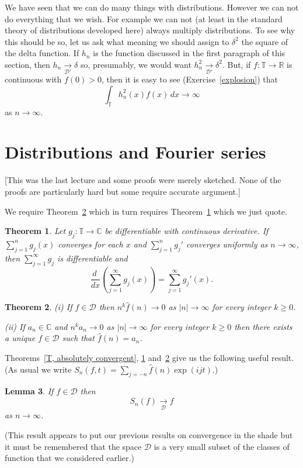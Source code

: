 \documentclass[12pt]{article}
\newtheorem{theorem}{Theorem}[section]
\newtheorem{lemma}[theorem]{Lemma}
\theoremstyle{definition}
\newcommand{\arrowD}{\underset{\mathcal D}{\rightarrow}}
\newcommand{\arrowd}{\underset{{\mathcal D}'}{\rightarrow}}
\begin{document}
We have seen that we can do many things with distributions.
However we can not do everything that we wish. For example
we can not (at least in the standard theory of distributions
developed here) always multiply distributions. To see why
this should be so, let us ask what meaning we should
assign to $\delta^{2}$ the square of the delta function.
If $h_{n}$ is the function discussed in the first paragraph
of this section, then $h_{n}\arrowd \delta$ so, presumably,
we would want $h_{n}^{2}\arrowd \delta^{2}$. But, if
$f:{\mathbb T}\rightarrow{\mathbb R}$ is continuous
with $f(0)>0$, then
it is easy to see (Exercise~\ref{explosion}) that
\[\int_{\mathbb T}h_{n}^{2}(x)f(x)\,dx\rightarrow\infty\]
as $n\rightarrow\infty$.
\section{Distributions and Fourier series}
[This was the last lecture and some proofs were merely sketched.
None of the proofs are particularly hard but some require 
accurate argument.]

We require Theorem~\ref{Very absolute} which in turn requires
Theorem~\ref{Can differentiate} which we just quote. 
\begin{theorem}\label{Can differentiate}
Let $g_{j}:{\mathbb T}\rightarrow{\mathbb C}$ be differentiable
with continuous derivative. If $\sum_{j=1}^{n}g_{j}(x)$
converges for each $x$ and
$\sum_{j=1}^{n}g_{j}'$ converges uniformly as
$n\rightarrow\infty$, then $\sum_{j=1}^{\infty}g_{j}$ is
differentiable and
\[\frac{d\ }{dx}\left(\sum_{j=1}^{\infty}g_{j}(x)\right)
=\sum_{j=1}^{\infty}g_{j}'(x).\]
\end{theorem}
\begin{theorem}\label{Very absolute}
(i) If $f\in{\mathcal D}$ then $n^{k}\hat{f}(n)\rightarrow 0$
as $|n|\rightarrow\infty$ for every integer $k\geq 0$.

(ii) If $a_{n}\in{\mathbb C}$ and
$n^{k}a_{n}\rightarrow 0$
as $|n|\rightarrow\infty$ for every integer $k\geq 0$
then there exists a unique $f\in{\mathcal D}$ such that
$\hat{f}(n)=a_{n}$.
\end{theorem}

Theorems~\ref{T, absolutely convergent},
\ref{Can differentiate} and~\ref{Very absolute}
give us the following useful result.
(As usual we write $S_{n}(f,t)=\sum_{j=-n}\hat{f}(n)\exp (ijt)$.)
\begin{lemma}\label{Fourier sum distribution} 
If $f\in{\mathcal D}$ then
\[S_{n}(f)\arrowD f\]
as $n\rightarrow\infty$.
\end{lemma}
(This result appears to put our previous results on
convergence in the shade but it must be remembered
that the space ${\mathcal D}$ is a very small subset
of the classes of function that we considered earlier.)
\end{document}
